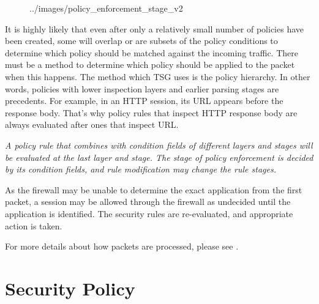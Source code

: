 
%    

\begin{figure}[htb]
    \centering
    {../images/policy_enforcement_stage_v2}
\end{figure}


It is highly likely that even after only a relatively small number of policies have been created, some will overlap or are subsets of the policy conditions to determine which policy should be matched against the incoming traffic. There must be a method to determine which policy should be applied to the packet when this happens. 
The method which TSG uses is the policy hierarchy. In other words, policies with lower inspection layers and earlier parsing stages are precedents. 
For example, in an HTTP session, its URL appears before the response body. That’s why policy rules that inspect HTTP response body are always evaluated after ones that inspect URL.


\notemark\textit{A policy rule that combines with condition fields of different layers and stages will be evaluated at the last layer and stage. 
The stage of policy enforcement is decided by its condition fields, and rule modification may change the rule stages.}


As the firewall may be unable to determine the exact application from the first packet, a session may be allowed through the firewall as undecided until the application is identified. 
The security rules are re-evaluated, and appropriate action is taken. 


For more details about how packets are processed, please see \hyperlink{link:Appendix D TSG Packet Flow}{\color{linkblue}{Appendix D TSG Packet Flow}}.

\section*{\hypertarget{link:Security Policy}{Security Policy}}
\label{sec:policies:security}

